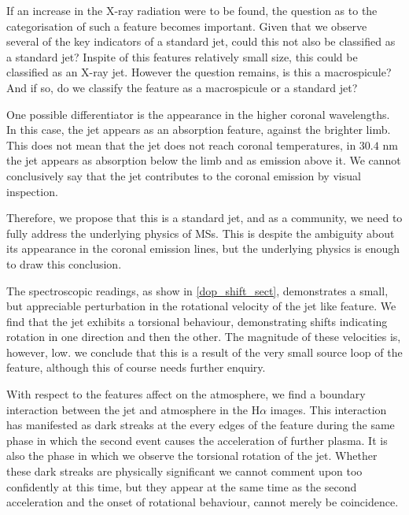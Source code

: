 If an increase in the X-ray radiation were to be found, the question as to the categorisation of such a feature becomes important.
Given that we observe several of the key indicators of a standard jet, could this not also be classified as a standard jet? 
Inspite of this features relatively small size, this could be classified as an X-ray jet.
However the question remains, is this a macrospicule?
And if so, do we classify the feature as a macrospicule or a standard jet?

One possible differentiator is the appearance in the higher coronal wavelengths.
In this case, the jet appears as an absorption feature, against the brighter limb.
This does not mean that the jet does not reach coronal temperatures, in $30.4$ nm the jet appears as absorption below the limb and as emission above it.
We cannot conclusively say that the jet contributes to the coronal emission by visual inspection.

Therefore, we propose that this is a standard jet, and as a community, we need to fully address the underlying physics of MSs.
This is despite the ambiguity about its appearance in the coronal emission lines, but the underlying physics is enough to draw this conclusion.

The spectroscopic readings, as show in \cref{dop_shift_sect}, demonstrates a small, but appreciable perturbation in the rotational velocity of the jet like feature.
We find that the jet exhibits a torsional behaviour, demonstrating shifts indicating rotation in one direction and then the other.
The magnitude of these velocities is, however, low.
we conclude that this is a result of the very small source loop of the feature, although this of course needs further enquiry. 

With respect to the features affect on the atmosphere, we find a boundary interaction between the jet and atmosphere in the H$\alpha$ images.
This interaction has manifested as dark streaks at the every edges of the feature during the same phase in which the second event causes the acceleration of further plasma.
It is also the phase in which we observe the torsional rotation of the jet.
Whether these dark streaks are physically significant we cannot comment upon too confidently at this time, but they appear at the same time as the second acceleration and the onset of rotational behaviour, cannot merely be coincidence.

